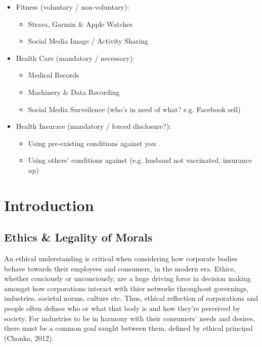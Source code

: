 \documentclass[11pt, english]{article}
\begin{document}
	\begin{itemize}
	\setlength\itemsep{0cm}
		\item Fitness (voluntary / non-voluntary):
		\begin{itemize}
			\item Strava, Garmin \& Apple Watches
			\item Social Media Image / Activity Sharing
		\end{itemize}
		\item Health Care (mandatory / necessary):
		\begin{itemize}
			\item Medical Records
			\item Machinery \& Data Recording
			\item Social Media Surveilence (who's in need of what? e.g. Facebook sell)
		\end{itemize}
		\item Health Insurace (mandatory / forced disclosure?):
		\begin{itemize}
			\item Using pre-existing conditions against you
			\item Using others' conditions against (e.g. husband not vaccinated, insurance up)
		\end{itemize}
	\end{itemize}

\newpage

\section{Introduction}

	\subsection{Ethics \& Legality of Morals}

	An ethical understanding is critical when considering how corporate bodies behave towards their employees and consumers, in the modern era. Ethics, whether conciously or unconciously, are a huge driving force in decision making amongst how corporations interact with thier networks throughout governings, industries, societal norms, culture etc. Thus, ethical reflection of corporations and people often defines who or what that body is and how they're perceived by society. For industries to be in harmony with their consumers' needs and desires, there must be a common goal saught between them, defined by ethical principal (Chonko, 2012).
\end{document}

